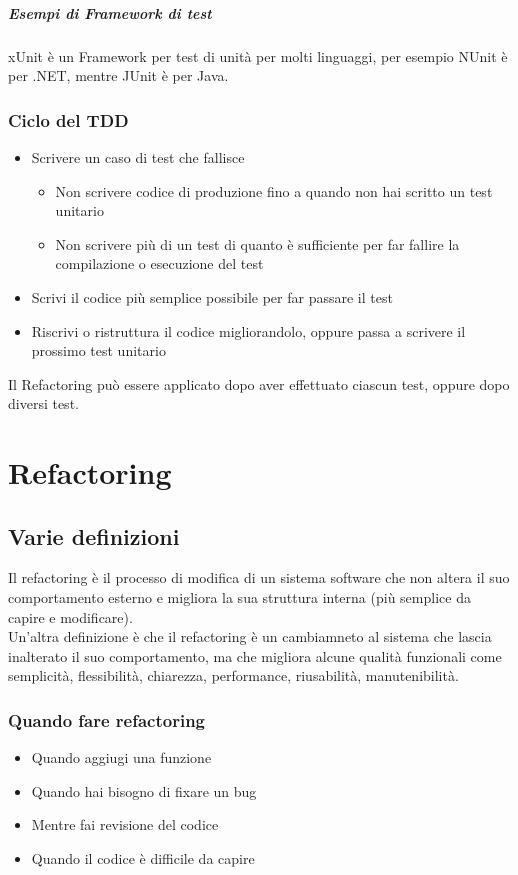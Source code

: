 \paragraph*{Esempi di Framework di test}
xUnit è un Framework per test di unità per molti linguaggi, per esempio NUnit è per .NET,
mentre JUnit è per Java.\\
\subsection{Ciclo del TDD}
\begin{itemize}
    \item Scrivere un caso di test che fallisce 
    \begin{itemize}
        \item Non scrivere codice di produzione fino a quando non hai scritto un
        test unitario
        \item Non scrivere più di un test di quanto è sufficiente per far fallire la
        compilazione o esecuzione del test
    \end{itemize}
    \item Scrivi il codice più semplice possibile per far passare il test
    \item Riscrivi o ristruttura il codice migliorandolo, oppure passa a scrivere il
    prossimo test unitario
\end{itemize}
Il Refactoring può essere applicato dopo aver effettuato ciascun test, oppure dopo diversi
test.
\chapter{Refactoring}
\section{Varie definizioni}
Il refactoring è il processo di modifica di un sistema software che non altera il suo
comportamento esterno e migliora la sua struttura interna (più semplice da capire e modificare).\\
Un'altra definizione è che il refactoring è un cambiamneto al sistema che lascia inalterato
il suo comportamento, ma che migliora alcune qualità funzionali come semplicità, flessibilità,
chiarezza, performance, riusabilità, manutenibilità.\\
\subsection{Quando fare refactoring}
\begin{itemize}
    \item Quando aggiugi una funzione
    \item Quando hai bisogno di fixare un bug
    \item Mentre fai revisione del codice
    \item Quando il codice è difficile da capire
\end{itemize}

